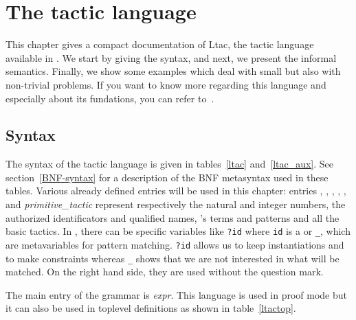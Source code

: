 \chapter{The tactic language}
\label{TacticLanguage}


This chapter gives a compact documentation of Ltac, the tactic
language available in {\Coq}. We start by giving the syntax, and next,
we present the informal semantics. Finally, we show some examples which
deal with small but also with non-trivial problems. If you want to
know more regarding this language and especially about its fundations,
you can refer to~\cite{Del00}.

\section{Syntax}

\def\nterm#1{\textrm{\textsl{#1}}}

\def\tacexpr{\textrm{\textsl{expr}}}
\def\tacexprlow{\textrm{\textsl{tacexpr$_1$}}}
\def\tacexprinf{\textrm{\textsl{tacexpr$_2$}}}
\def\tacexprpref{\textrm{\textsl{tacexpr$_3$}}}
\def\atom{\textrm{\textsl{atom}}}
\def\recclause{\textrm{\textsl{rec\_clause}}}
\def\letclause{\textrm{\textsl{let\_clause}}}
\def\matchrule{\textrm{\textsl{match\_rule}}}
\def\contextrule{\textrm{\textsl{context\_rule}}}
\def\contexthyps{\textrm{\textsl{context\_hyps}}}
\def\primitivetactic{\textrm{\textsl{primitive\_tactic}}}
\def\tacarg{\textrm{\textsl{arg}}}
\def\qstring{\textrm{\textsl{string}}}
\def\name{\textrm{\textsl{name}}}

The syntax of the tactic language is given in tables~\ref{ltac}
and~\ref{ltac_aux}. See section~\ref{BNF-syntax} for a description of
the BNF metasyntax used in these tables. Various already defined
entries will be used in this chapter: entries {\naturalnumber},
{\integer}, {\ident}, {\qualid}, {\term}, {\pattern} and
{\primitivetactic} represent respectively the natural and integer
numbers, the authorized identificators and qualified names, {\Coq}'s
terms and patterns and all the basic tactics. In {\pattern}, there can
be specific variables like {\tt ?id} where {\tt id} is a {\ident} or
{\tt \_}, which are metavariables for pattern matching. {\tt ?id} allows
us to keep instantiations and to make constraints whereas {\tt \_}
shows that we are not interested in what will be matched. On the right
hand side, they are used without the question mark.

The main entry of the grammar is {\tacexpr}. This language is used in
proof mode but it can also be used in toplevel definitions as shown in
table~\ref{ltactop}.

